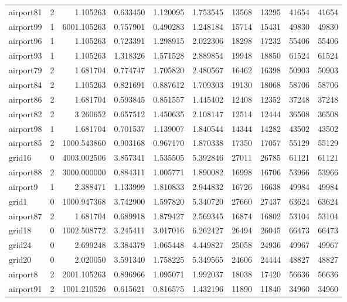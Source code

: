 \begin{longtable}{|l|r|r|r|r|r|r|r|r|r|}
airport81 & 2 & 1.105263 & 0.633450 & 1.120095 & 1.753545 & 13568 & 13295 & 41654 & 41654 \\
airport99 & 1 & 6001.105263 & 0.757901 & 0.490283 & 1.248184 & 15714 & 15431 & 49830 & 49830 \\
airport96 & 1 & 1.105263 & 0.723391 & 1.298915 & 2.022306 & 18298 & 17232 & 55406 & 55406 \\
airport93 & 1 & 1.105263 & 1.318326 & 1.571528 & 2.889854 & 19948 & 18850 & 61524 & 61524 \\
airport79 & 2 & 1.681704 & 0.774747 & 1.705820 & 2.480567 & 16462 & 16398 & 50903 & 50903 \\
airport84 & 2 & 1.105263 & 0.821691 & 0.887612 & 1.709303 & 19130 & 18068 & 58706 & 58706 \\
airport86 & 2 & 1.681704 & 0.593845 & 0.851557 & 1.445402 & 12408 & 12352 & 37248 & 37248 \\
airport82 & 2 & 3.260652 & 0.657512 & 1.450635 & 2.108147 & 12514 & 12444 & 36508 & 36508 \\
airport98 & 1 & 1.681704 & 0.701537 & 1.139007 & 1.840544 & 14344 & 14282 & 43502 & 43502 \\
airport85 & 2 & 1000.543860 & 0.903168 & 0.967170 & 1.870338 & 17350 & 17057 & 55129 & 55129 \\
grid16 & 0 & 4003.002506 & 3.857341 & 1.535505 & 5.392846 & 27011 & 26785 & 61121 & 61121 \\
airport88 & 2 & 3000.000000 & 0.884311 & 1.005771 & 1.890082 & 16998 & 16706 & 53966 & 53966 \\
airport9 & 1 & 2.388471 & 1.133999 & 1.810833 & 2.944832 & 16726 & 16638 & 49984 & 49984 \\
grid1 & 0 & 1000.947368 & 3.742900 & 1.597820 & 5.340720 & 27660 & 27437 & 63624 & 63624 \\
airport87 & 2 & 1.681704 & 0.689918 & 1.879427 & 2.569345 & 16874 & 16802 & 53104 & 53104 \\
grid18 & 0 & 1002.508772 & 3.245411 & 3.017016 & 6.262427 & 26494 & 26045 & 66473 & 66473 \\
grid24 & 0 & 2.699248 & 3.384379 & 1.065448 & 4.449827 & 25058 & 24936 & 49967 & 49967 \\
grid20 & 0 & 2.020050 & 3.591340 & 1.758225 & 5.349565 & 24606 & 24444 & 48827 & 48827 \\
airport8 & 2 & 2001.105263 & 0.896966 & 1.095071 & 1.992037 & 18038 & 17420 & 56636 & 56636 \\
airport91 & 2 & 1001.210526 & 0.615621 & 0.816575 & 1.432196 & 11890 & 11840 & 34960 & 34960 \\

\end{longtable}
